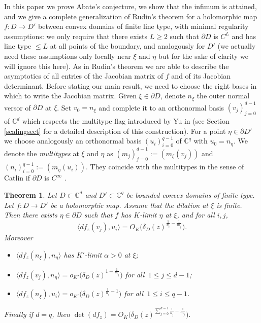 \documentclass[11pt, reqno]{amsart}
\numberwithin{equation}{section}
\newtheorem{theorem}{Theorem}[section]
\theoremstyle{definition}
\newcommand{\C}{\mathbb{C}}
\begin{document}
	In this paper we prove Abate's conjecture, we show that the infimum is attained, and  we give a complete generalization of Rudin's theorem for a holomorphic map $f\colon D\to D'$ between convex domains of finite line type, with minimal  regularity assumptions: we only require
	that there exists $L\geq 2$ such that $\partial D$ is $C^L$ and has line type $\leq L$ at all points of the boundary, and analogously for $D'$  (we actually need these assumptions only locally near $\xi$ and $\eta$ but for the sake of clarity we will ignore this here).
	As in Rudin's theorem we are able to describe the  asymptotics of all entries of the Jacobian matrix of $f$ and of its Jacobian determinant. Before stating our main result, we need to choose the right bases in which to write the Jacobian matrix.
	Given $\xi\in \partial D$, denote $n_\xi$ the outer normal versor of $\partial D$ at $\xi$. Set $v_0=n_\xi$ and complete it to an orthonormal  basis
	$(v_j)_{j=0}^{d-1}$ of $\C^d$ which respects the multitype flag introduced by Yu in \cite{Yu} (see Section \ref{scalingsect} for a detailed description of this construction).  
	For a point $\eta\in \partial D'$ we choose analogously an orthonormal basis $(u_i)_{i=0}^{q-1}$  of $\C^q$ with $u_0=n_\eta$.
	We denote the {\sl multitypes} at $\xi$ and $\eta$ as $(m_j)_{j=0}^{d-1}:=(m_\xi(v_j))$ 
	and $(n_i)_{i=0}^{q-1}:=(m_\eta(u_i))$. They coincide with the multitypes in the sense of Catlin if $\partial D$ is $C^\infty$ \cite{Yu}. 
	\begin{theorem}\label{maint}
		Let $D\subset \C^d$ and $D'\subset \C^q$ be bounded convex domains of finite type. Let $f\colon D\to D'$ be a holomorphic map.
		Assume that the dilation at $\xi$ is finite.
		Then there exists $\eta\in \partial D$ such that $f$ has $K$-limit $\eta$ at $\xi$, and  for all $i,j$,
		\begin{equation}\label{estimateimproves} \langle df_z(v_j),u_i \rangle=O_K\biggl(\delta_D(z)^{\frac{1}{n_i}-\frac{1}{m_j}}\biggr).
		\end{equation}
		Moreover
		\begin{itemize}
			\item[(i)] $\langle df_z(n_\xi),n_\eta\rangle$  has $K'$-limit $\alpha>0$ at $\xi$;
			\item[(ii)]  $\langle df_z(v_j),n_\eta \rangle=   o_{K'}\biggl(\delta_D(z)^{1-\frac{1}{m_j}}\biggr)$ for all\,  $1\leq j\leq d-1$;
			\item[(iii)]  $\langle df_z(n_\xi),u_i\rangle=o_{K'}\biggl(\delta_D(z)^{\frac{1}{n_i}-1}\biggr)$ for all\, $1\leq i\leq q-1$.
		\end{itemize}
		Finally if $d=q$, then $\det(df_z)=O_K\biggl(\delta_D(z)^{\sum_{j=0}^{d-1}\frac{1}{n_j}-\frac{1}{m_j}}\biggr).$
	\end{theorem}
\end{document}
